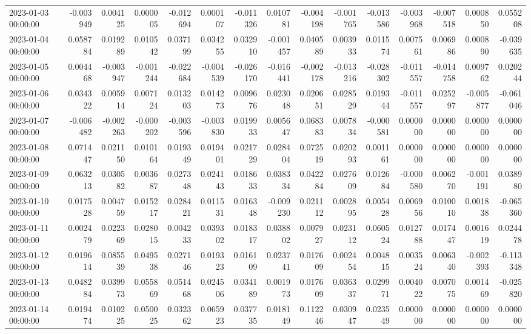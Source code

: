 \begin{tabular}{lrrrrrrrrrrrrrr}
2023-01-03 00:00:00 & -0.003949 & 0.004125 & 0.000005 & -0.012694 & 0.000107 & -0.011326 & 0.010781 & -0.004198 & -0.001765 & -0.013586 & -0.003968 & -0.007518 & 0.000850 & 0.055208 \\
2023-01-04 00:00:00 & 0.058784 & 0.019289 & 0.010542 & 0.037199 & 0.034255 & 0.032910 & -0.001457 & 0.040589 & 0.003933 & 0.011574 & 0.007561 & 0.006986 & 0.000890 & -0.039635 \\
2023-01-05 00:00:00 & 0.004468 & -0.003947 & -0.001244 & -0.022684 & -0.004539 & -0.026170 & -0.016441 & -0.002178 & -0.013216 & -0.028302 & -0.011557 & -0.014758 & 0.009762 & 0.020244 \\
2023-01-06 00:00:00 & 0.034322 & 0.005914 & 0.007124 & 0.013203 & 0.014273 & 0.009676 & 0.023048 & 0.020651 & 0.028529 & 0.019344 & -0.011557 & 0.025297 & -0.005877 & -0.061046 \\
2023-01-07 00:00:00 & -0.006482 & -0.002263 & -0.000202 & -0.003596 & -0.003830 & 0.019933 & 0.005647 & 0.068383 & 0.007834 & -0.000581 & 0.000000 & 0.000000 & 0.000000 & 0.000000 \\
2023-01-08 00:00:00 & 0.071447 & 0.021150 & 0.010164 & 0.019349 & 0.019401 & 0.021729 & 0.028404 & 0.072519 & 0.020293 & 0.001161 & 0.000000 & 0.000000 & 0.000000 & 0.000000 \\
2023-01-09 00:00:00 & 0.063213 & 0.030582 & 0.003687 & 0.027348 & 0.024143 & 0.018633 & 0.038334 & 0.042284 & 0.027609 & 0.012684 & -0.000580 & 0.006270 & -0.001191 & 0.038980 \\
2023-01-10 00:00:00 & 0.017528 & 0.004759 & 0.015217 & 0.028421 & 0.011531 & 0.016348 & -0.009230 & 0.021112 & 0.002895 & 0.005428 & 0.006956 & 0.010010 & 0.001838 & -0.065360 \\
2023-01-11 00:00:00 & 0.002479 & 0.022369 & 0.028015 & 0.004233 & 0.039302 & 0.018317 & 0.038802 & 0.007927 & 0.023112 & 0.060524 & 0.012788 & 0.017447 & 0.001619 & 0.024478 \\
2023-01-12 00:00:00 & 0.019614 & 0.085539 & 0.049538 & 0.027146 & 0.019323 & 0.016109 & 0.023741 & 0.017609 & 0.002454 & 0.004815 & 0.003524 & 0.006340 & -0.002393 & -0.113348 \\
2023-01-13 00:00:00 & 0.048284 & 0.039973 & 0.055869 & 0.051468 & 0.024506 & 0.034189 & 0.001973 & 0.017609 & 0.036337 & 0.029971 & 0.004022 & 0.007075 & 0.001469 & -0.025820 \\
2023-01-14 00:00:00 & 0.019474 & 0.010225 & 0.050025 & 0.032362 & 0.065923 & 0.037735 & 0.018149 & 0.112246 & 0.030947 & 0.023549 & 0.000000 & 0.000000 & 0.000000 & 0.000000 \\

\end{tabular}
